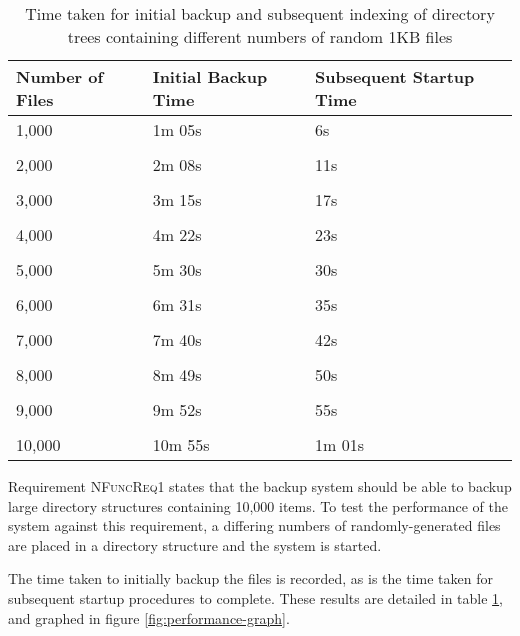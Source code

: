 \begin{table}
    \centering
    \begin{tabular}{ l l l }
        Number of Files & Initial Backup Time   & Subsequent Startup Time
        \\ \toprule
        1,000           & 1m 05s                & 6s
        \\ \\
        2,000           & 2m 08s                & 11s
        \\ \\
        3,000           & 3m 15s                & 17s
        \\ \\
        4,000           & 4m 22s                & 23s
        \\ \\
        5,000           & 5m 30s                & 30s
        \\ \\
        6,000           & 6m 31s                & 35s
        \\ \\
        7,000           & 7m 40s                & 42s
        \\ \\
        8,000           & 8m 49s                & 50s
        \\ \\
        9,000           & 9m 52s                & 55s
        \\ \\
        10,000          & 10m 55s               & 1m 01s
        \\ \bottomrule
    \end{tabular}
    \caption{Time taken for initial backup and subsequent indexing of
    directory trees containing different numbers of random 1KB files}
    \label{tab:performance}
\end{table}

Requirement \textsc{NFuncReq1} states that the backup system should be able to
backup large directory structures containing 10,000 items. To test the
performance of the system against this requirement, a differing numbers of
randomly-generated files are placed in a directory structure and the system is
started.

The time taken to initially backup the files is recorded, as is the time taken
for subsequent startup procedures to complete. These results are detailed in
table \ref{tab:performance}, and graphed in figure \ref{fig:performance-graph}.

